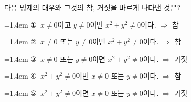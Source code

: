 다음 명제의 대우와 그것의 참, 거짓을 바르게 나타낸 것은?  
\par\medskip\par\noindent\hangindent=1.4em {\small ①}\ $x\ne 0$이고 $y\ne 0$이면 $x^2+y^2\ne 0$이다. $\Rightarrow$ 참\par\noindent\hangindent=1.4em {\small ②}\ $x\ne 0$ 또는 $y\ne 0$이면 $x^2+y^2\ne 0$이다. $\Rightarrow$ 참\par\noindent\hangindent=1.4em {\small ③}\ $x\ne 0$ 또는 $y\ne 0$이면 $x^2+y^2\ne 0$이다. $\Rightarrow$ 거짓\par\noindent\hangindent=1.4em {\small ④}\ $x^2+y^2\ne 0$이면 $x\ne 0$ 또는 $y\ne 0$이다. $\Rightarrow$ 참\par\noindent\hangindent=1.4em {\small ⑤}\ $x^2+y^2\ne 0$이면 $x\ne 0$ 또는 $y\ne 0$이다. $\Rightarrow$ 거짓\par\medskip
